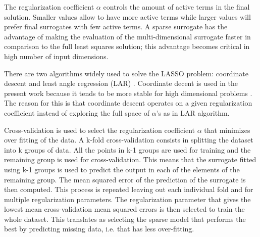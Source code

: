 \documentclass[preprint,12pt]{elsarticle}
\begin{document}
The regularization coefficient $\alpha$ controls the amount of active terms in the final solution. Smaller values allow to have more active terms while larger values will prefer final surrogates with few active terms. A sparse surrogate has the advantage of making the evaluation of the multi-dimensional surrogate faster in comparison to the full least squares solution; this advantage becomes critical in high number of input dimensions.

There are two algorithms widely used to solve the LASSO problem: coordinate descent \cite{tibshirani1996regression} and least angle regression (LAR) \cite{blatman2011adaptive}. Coordinate decent is used in the present work because it tends to be more stable for high dimensional problems \cite{pedregosa2011scikit}. The reason for this is that coordinate descent operates on a given regularization coefficient instead of exploring the full space of $\alpha$'s as in LAR algorithm.


Cross-validation is used to select the regularization coefficient $\alpha$ that minimizes over fitting of the data. A k-fold cross-validation consists in splitting the dataset into k groups of data. All the points in k-1 groups are used for training and the remaining group is used for cross-validation. This means that the surrogate fitted using k-1 groups is used to predict the output in each of the elements of the remaining group. The mean squared error of the prediction of the surrogate is then computed. This process is repeated leaving out each individual fold and for multiple regularization parameters. The regularization parameter that gives the lowest mean cross-validation mean squared errors is then selected to train the whole dataset. This translates as selecting the sparse model that performs the best by predicting missing data, i.e. that has less over-fitting. 


\end{document}
